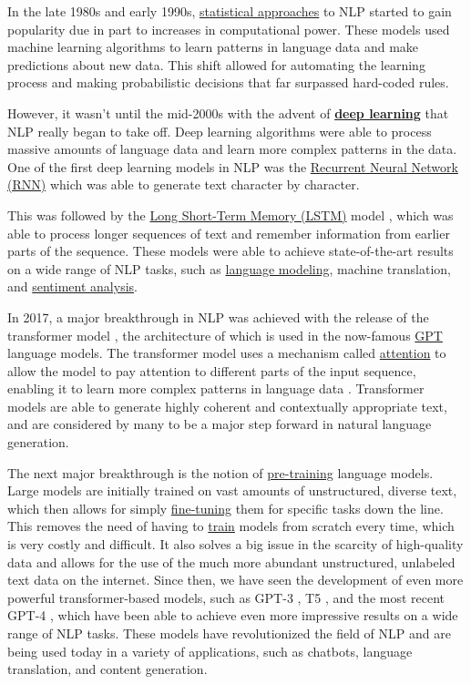 \documentclass[12pt]{article}
\begin{document}
In the late 1980s and early 1990s, \hyperref[item:statistical]{statistical approaches} to NLP started to gain popularity due in part to increases in computational power. These models used machine learning algorithms to learn patterns in language data and make predictions about new data. This shift allowed for automating the learning process and making probabilistic decisions that far surpassed hard-coded rules.

However, it wasn't until the mid-2000s with the advent of \hyperref[item:deep-learning]{\textbf{deep learning}} that NLP really began to take off. Deep learning algorithms were able to process massive amounts of language data and learn more complex patterns in the data. One of the first deep learning models in NLP was the \hyperref[item:rnn]{Recurrent Neural Network (RNN)} \cite{Mikolov2010RecurrentNN} which was able to generate text character by character.

This was followed by the \hyperref[item:lstm]{Long Short-Term Memory (LSTM)} model \cite{Graves2013GeneratingSW}, which was able to process longer sequences of text and remember information from earlier parts of the sequence. These models were able to achieve state-of-the-art results on a wide range of NLP tasks, such as \hyperref[item:language-modeling]{language modeling}, machine translation, and \hyperref[item:sentiment-analysis]{sentiment analysis}.

In 2017, a major breakthrough in NLP was achieved with the release of the transformer model \cite{Vaswani2017AttentionIA}, the architecture of which is used in the now-famous \hyperref[item:gpt]{GPT} language models. The transformer model uses a mechanism called \hyperref[item:attention]{attention} to allow the model to pay attention to different parts of the input sequence, enabling it to learn more complex patterns in language data \cite{Bahdanau2015EndtoendAL}. Transformer models are able to generate highly coherent and contextually appropriate text, and are considered by many to be a major step forward in natural language generation.

The next major breakthrough is the notion of \hyperref[item:pre-training]{pre-training} language models. Large models are initially trained on vast amounts of unstructured, diverse text, which then allows for simply \hyperref[item:finetuning]{fine-tuning} them for specific tasks down the line. This removes the need of having to \hyperref[item:training]{train} models from scratch every time, which is very costly and difficult. It also solves a big issue in the scarcity of high-quality data and allows for the use of the much more abundant unstructured, unlabeled text data on the internet. 
Since then, we have seen the development of even more powerful transformer-based models, such as GPT-3 \cite{Brown2020LanguageMA}, T5 \cite{Raffel2019ExploringTL}, and the most recent GPT-4 \cite{OpenAI2023GPT4TR}, which have been able to achieve even more impressive results on a wide range of NLP tasks. These models have revolutionized the field of NLP and are being used today in a variety of applications, such as chatbots, language translation, and content generation.
\end{document}
